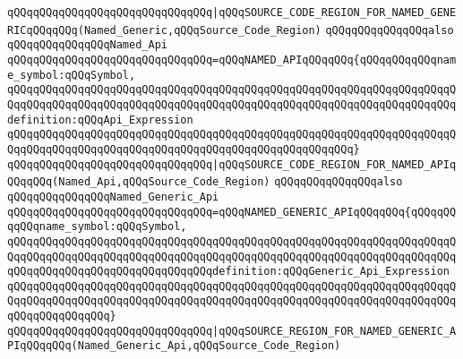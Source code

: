\verb|qQQqqQQqqQQqqQQqqQQqqQQqqQQqqQQq|\verb#|qQQqSOURCE_CODE_REGION_FOR_NAMED_GENERICqQQqqQQq(Named_Generic,qQQqSource_Code_Region)#\newline
\newline
\newline
\newline
\verb|qQQqqQQqqQQqqQQqalso|\newline
\verb|qQQqqQQqqQQqqQQqNamed_Api|\newline
\newline
\verb|qQQqqQQqqQQqqQQqqQQqqQQqqQQqqQQq=qQQqNAMED_APIqQQqqQQq{qQQqqQQqqQQqname_symbol:qQQqSymbol,|\newline
\verb|qQQqqQQqqQQqqQQqqQQqqQQqqQQqqQQqqQQqqQQqqQQqqQQqqQQqqQQqqQQqqQQqqQQqqQQqqQQqqQQqqQQqqQQqqQQqqQQqqQQqqQQqqQQqqQQqqQQqqQQqqQQqqQQqqQQqqQQqqQQqdefinition:qQQqApi_Expression|\newline
\verb|qQQqqQQqqQQqqQQqqQQqqQQqqQQqqQQqqQQqqQQqqQQqqQQqqQQqqQQqqQQqqQQqqQQqqQQqqQQqqQQqqQQqqQQqqQQqqQQqqQQqqQQqqQQqqQQqqQQqqQQqqQQq}|\newline
\newline
\verb|qQQqqQQqqQQqqQQqqQQqqQQqqQQqqQQq|\verb#|qQQqSOURCE_CODE_REGION_FOR_NAMED_APIqQQqqQQq(Named_Api,qQQqSource_Code_Region)#\newline
\newline
\newline
\newline
\verb|qQQqqQQqqQQqqQQqalso|\newline
\verb|qQQqqQQqqQQqqQQqNamed_Generic_Api|\newline
\newline
\verb|qQQqqQQqqQQqqQQqqQQqqQQqqQQqqQQq=qQQqNAMED_GENERIC_APIqQQqqQQq{qQQqqQQqqQQqname_symbol:qQQqSymbol,|\newline
\verb|qQQqqQQqqQQqqQQqqQQqqQQqqQQqqQQqqQQqqQQqqQQqqQQqqQQqqQQqqQQqqQQqqQQqqQQqqQQqqQQqqQQqqQQqqQQqqQQqqQQqqQQqqQQqqQQqqQQqqQQqqQQqqQQqqQQqqQQqqQQqqQQqqQQqqQQqqQQqqQQqqQQqqQQqqQQqdefinition:qQQqGeneric_Api_Expression|\newline
\verb|qQQqqQQqqQQqqQQqqQQqqQQqqQQqqQQqqQQqqQQqqQQqqQQqqQQqqQQqqQQqqQQqqQQqqQQqqQQqqQQqqQQqqQQqqQQqqQQqqQQqqQQqqQQqqQQqqQQqqQQqqQQqqQQqqQQqqQQqqQQqqQQqqQQqqQQqqQQq}|\newline
\newline
\verb|qQQqqQQqqQQqqQQqqQQqqQQqqQQqqQQq|\verb#|qQQqSOURCE_REGION_FOR_NAMED_GENERIC_APIqQQqqQQq(Named_Generic_Api,qQQqSource_Code_Region)#\newline
\newline
\newline
